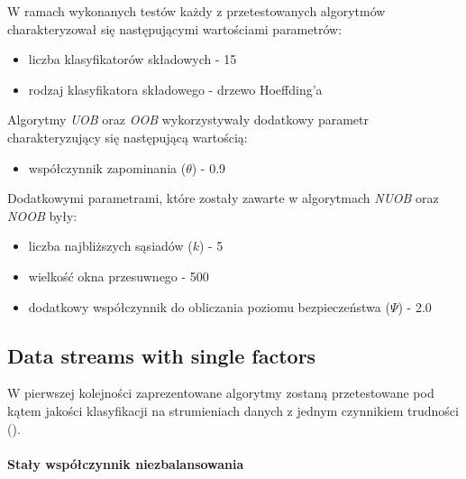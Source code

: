 \noindent W ramach wykonanych testów każdy z przetestowanych algorytmów charakteryzował się następującymi wartościami parametrów:

\begin{itemize}
    \item liczba klasyfikatorów składowych - 15
    \item rodzaj klasyfikatora składowego - drzewo Hoeffding'a
\end{itemize}

\noindent Algorytmy \textit{UOB} oraz \textit{OOB} wykorzystywały dodatkowy parametr charakteryzujący się następującą wartością:

\begin{itemize}
    \item współczynnik zapominania ($\theta$) - 0.9
\end{itemize}

\noindent Dodatkowymi parametrami, które zostały zawarte w algorytmach \textit{NUOB} oraz \textit{NOOB} były:

\begin{itemize}
    \item liczba najbliższych sąsiadów ($k$) - 5
    \item wielkość okna przesuwnego - 500
    \item dodatkowy współczynnik do obliczania poziomu bezpieczeństwa ($\Psi$) - 2.0
\end{itemize}

\newpage

\subsection{Data streams with single factors}

\noindent W pierwszej kolejności zaprezentowane algorytmy zostaną przetestowane pod kątem jakości klasyfikacji na strumieniach danych z jednym czynnikiem trudności ().\\\\
\textbf{Stały współczynnik niezbalansowania}\\

